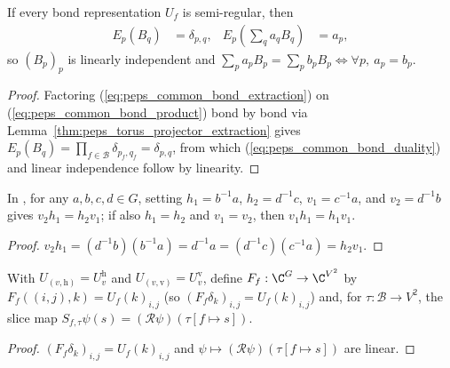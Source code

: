 \begin{lemma}%
    \label{thm:peps_four_cut_common_coefficient_uniqueness}
    \leanok
    If every bond representation $U_f$ is semi-regular, then
    \begin{align}
        E_p(B_q)                      & =\delta_{p,q}, &
        E_p\left(\sum_q a_qB_q\right) & =a_p,
        \label{eq:peps_common_bond_duality}
    \end{align}
    so $(B_p)_p$ is linearly independent and $\sum_pa_pB_p=\sum_pb_pB_p\iff\forall p,\ a_p=b_p$.
\end{lemma}
\begin{proof}\leanok
    Factoring (\ref{eq:peps_common_bond_extraction}) on (\ref{eq:peps_common_bond_product}) bond by bond via Lemma~\ref{thm:peps_torus_projector_extraction} gives $E_p(B_q)=\prod_{f\in\mathcal B}\delta_{p_f,q_f}=\delta_{p,q}$, from which (\ref{eq:peps_common_bond_duality}) and linear independence follow by linearity.
\end{proof}

\begin{lemma}%
    \label{thm:peps_four_cut_common_relative_compatibility}
    \leanok
    In \cite[Theorem~5.5]{Schuch2010PEPS}, for any $a,b,c,d\in G$, setting $h_1=b^{-1}a$, $h_2=d^{-1}c$, $v_1=c^{-1}a$, and $v_2=d^{-1}b$ gives $v_2h_1=h_2v_1$; if also $h_1=h_2$ and $v_1=v_2$, then $v_1h_1=h_1v_1$.
\end{lemma}
\begin{proof}\leanok
    $v_2h_1=(d^{-1}b)(b^{-1}a)=d^{-1}a=(d^{-1}c)(c^{-1}a)=h_2v_1$.
\end{proof}

\begin{definition}%
    \label{def:peps_four_cut_common_bond_slices}
    \leanok
    With $U_{(v,\mathrm h)}=U^{\mathrm h}_v$ and $U_{(v,\mathrm v)}=U^{\mathrm v}_v$, define $F_f:\C^G\to\C^{V^2}$ by $F_f((i,j),k)=U_f(k)_{i,j}$ (so $(F_f\delta_k)_{i,j}=U_f(k)_{i,j}$) and, for $\tau:\mathcal B\to V^2$, the slice map $S_{f,\tau}\psi(s)=(\mathcal R\psi)(\tau[f\mapsto s])$.
\end{definition}
\begin{proof}\leanok
    $(F_f\delta_k)_{i,j}=U_f(k)_{i,j}$ and $\psi\mapsto(\mathcal R\psi)(\tau[f\mapsto s])$ are linear.
\end{proof}

